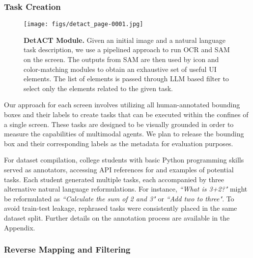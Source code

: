 \subsubsection{Task Creation}

\begin{figure*}[!ht]
    \centering
    \texttt{[image: figs/detact\_page-0001.jpg]}
    \caption{\textbf{DetACT Module.} Given an initial image and a natural language task description, we use a pipelined approach to run OCR and SAM on the screen. The outputs from SAM are then used by icon and color-matching modules to obtain an exhaustive set of useful UI elements. The list of elements is passed through LLM based filter to select only the elements related to the given task.}
    \label{fig:detact}
\end{figure*}

Our approach for each screen involves utilizing all human-annotated bounding boxes and their labels to create tasks that can be executed within the confines of a single screen. These tasks are designed to be visually grounded in order to measure the capabilities of multimodal agents. We plan to release the bounding box and their corresponding labels as the metadata for evaluation purposes.

For dataset compilation, college students with basic Python programming skills served as annotators, accessing API references for \textit{\pyautogui} and examples of potential tasks. Each student generated multiple tasks, each accompanied by three alternative natural language reformulations. For instance, \textit{``What is 3+2?"} might be reformulated as \textit{``Calculate the sum of 2 and 3"} or \textit{``Add two to three"}. To avoid train-test leakage, rephrased tasks were consistently placed in the same dataset split. Further details on the annotation process are available in the Appendix.

\subsubsection{Reverse Mapping and Filtering}

